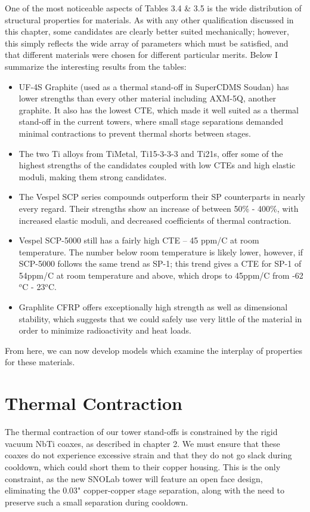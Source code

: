 \documentclass{report}
\begin{document}
One of the most noticeable aspects of Tables 3.4 \& 3.5 is the wide distribution of structural properties for materials. As with any other qualification discussed in this chapter, some candidates are clearly better suited mechanically; however, this simply reflects the wide array of parameters which must be satisfied, and that different materials were chosen for different particular merits. Below I summarize the interesting results from the tables:
\begin{itemize}
\item UF-4S Graphite (used as a thermal stand-off in SuperCDMS Soudan) has lower strengths than every other material including AXM-5Q,
another graphite. It also has the lowest CTE, which made it well suited as a thermal stand-off in the current towers, where small stage separations demanded minimal contractions to prevent thermal shorts between stages.
\item The two Ti alloys from TiMetal, Ti15-3-3-3 and Ti21s, offer some of the highest strengths of the candidates coupled with low CTEs and high elastic moduli, making them strong candidates.
\item The Vespel SCP series compounds outperform their SP counterparts in nearly every regard. Their strengths show an increase of between 50\% - 400\%, with increased elastic moduli, and decreased coefficients of thermal contraction.
\item Vespel SCP-5000 still has a fairly high CTE -- 45 ppm/C at room temperature. The number below room temperature is likely lower, however, if SCP-5000 follows the same trend as SP-1; this trend gives a CTE for SP-1 of 54ppm/C at room temperature and above, which drops to 45ppm/C from -62$^{o}$C - 23$^{o}$C.
\item Graphlite CFRP offers exceptionally high strength as well as dimensional stability, which suggests that we could safely use very little of the material in order to minimize radioactivity and heat loads.
\end{itemize}

From here, we can now develop models which examine the interplay of properties for these materials.


\section{Thermal Contraction}

The thermal contraction of our tower stand-offs is constrained by the rigid vacuum NbTi coaxes, as described in chapter 2. We must ensure that these coaxes do not experience excessive strain and that they do not go slack during cooldown, which could short them to their copper housing. This is the only constraint, as the new SNOLab tower will feature an open face design, eliminating the 0.03" copper-copper stage separation, along with the need to preserve such a small separation during cooldown.
\end{document}
